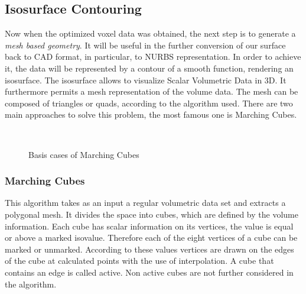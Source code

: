 \subsection{Isosurface Contouring}
Now when the optimized voxel data was obtained, the next step is to generate a \emph{mesh based
geometry}. It will be useful in the further conversion of our surface back to CAD format, in particular, to NURBS representation. In order to achieve it, the
data will be represented by a contour of a smooth function, rendering an isosurface. The
isosurface allows to visualize Scalar Volumetric Data in 3D. It furthermore permits a mesh
representation of the volume data. The mesh can be composed of triangles or quads, according
to the algorithm used. There are two main approaches to solve this problem, the most
famous one is Marching Cubes.

\begin{figure}
\centering
   \\
   \caption{Basis cases of Marching Cubes}
\end{figure}

\subsubsection{Marching Cubes} 

This algorithm takes as an input a regular volumetric data set and extracts a polygonal mesh. It
divides the space into cubes, which are defined by the volume information. Each cube has scalar
information on its vertices, the value is equal or above a marked isovalue. Therefore each of the
eight vertices of a cube can be marked or unmarked. According to these values vertices are drawn
on the edges of the cube at calculated points with the use of interpolation. A cube that contains
an edge is called active. Non active cubes are not further considered in the algorithm.


